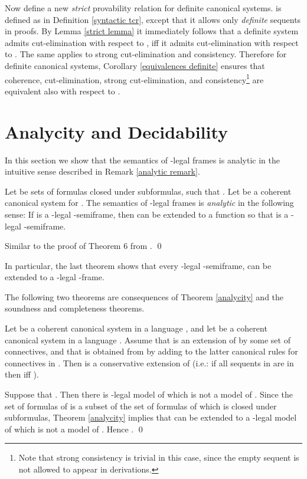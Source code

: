 \documentclass{LMCS}
\theoremstyle{remark}
\begin{document}
\begin{enumerate}[(a)]
\begin{enumerate}[\bf(a):]
Now define a new {\em strict} provability relation  for definite canonical systems.
 is defined as in Definition \ref{syntactic tcr}, except that
it  allows only {\em definite} sequents in proofs.
By Lemma \ref{strict lemma} it immediately follows 
that a definite system admits cut-elimination with respect to , 
iff it admits cut-elimination with respect to .
The same applies to strong cut-elimination and consistency.
Therefore for definite canonical systems,
Corollary \ref{equivalences definite} ensures that
coherence, cut-elimination, strong cut-elimination, and consistency\footnote{Note that strong consistency
is trivial in this case, since the empty sequent is not allowed to appear in derivations.}
are equivalent also with respect to .

\section{Analycity and Decidability}

In this section we show that the 
semantics of -legal frames is analytic in the intuitive sense described 
in Remark \ref{analytic remark}.



\begin{thm}[Analycity]
\label{analycity}
Let  be sets of formulas closed under subformulas, 
such that .
Let  be a coherent canonical system for .
The semantics of -legal frames is {\em analytic}
in the following sense: 
If  is a -legal -semiframe, 
then  can be extended to a function  so that 
 is a -legal -semiframe.
\end{thm}
\proof
Similar to the proof of Theorem 6 from \cite{AL10}.
\qed


\begin{rem}
In particular, the last theorem shows that 
every -legal -semiframe, 
can be extended to a -legal -frame.
\end{rem}

The following two theorems are consequences 
of Theorem \ref{analycity} and the
soundness and completeness theorems.

\begin{thm}[Conservativity]
\label{conservativity}
Let  be a coherent canonical system
in a language , and let  be a 
coherent canonical  system in a language .
Assume that  is an extension of 
by some set of connectives, and that 
is obtained from  by adding to the latter
canonical rules for connectives in .
Then  is a conservative extension of 
(i.e.: if all sequents in 
are in  then 
iff ).
\end{thm}
\proof
Suppose that . 
Then there is -legal model  of  which is not a model of . 
Since the set of formulas of  is a subset of the set of formulas of  which is
closed under subformulas, 
Theorem \ref{analycity} implies that  can be extended to a -legal model 
of  which is not a model of .
Hence .
\qed


\end{enumerate}
\end{enumerate}
\end{document}
